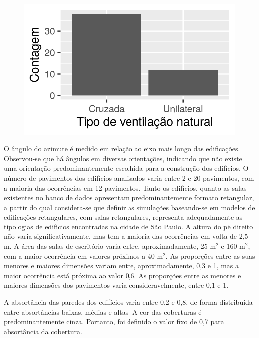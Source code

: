 \documentclass[brazil,hardcopy,openany]{ufscthesis} %
\begin{document}
\begin{figure}[H]
\begin{minipage}{.33\textwidth}
	\end{minipage}
	\begin{minipage}{.33\textwidth}
		\includegraphics[width=\linewidth]{img/hist_tipo_vn.png}
	\end{minipage}
\end{figure}
\newpage

O ângulo do azimute é medido em relação ao eixo mais longo das edificações. Observou-se que há ângulos em diversas orientações, indicando que não existe uma orientação predominantemente escolhida para a construção dos edifícios.
O número de pavimentos dos edifícios analisados varia entre 2 e 20 pavimentos, com a maioria das ocorrências em 12 pavimentos.
Tanto os edifícios, quanto as salas existentes no banco de dados apresentam predominantemente formato retangular, a partir do qual considera-se que definir as simulações baseando-se em modelos de edificações retangulares, com salas retangulares, representa adequadamente as tipologias de edifícios encontradas na cidade de São Paulo.
A altura do pé direito não varia significativamente, mas tem a maioria das ocorrências em volta de 2,5 m.
A área das salas de escritório varia entre, aproximadamente, 25 m$^2$ e 160 m$^2$, com a maior ocorrência em valores próximos a 40 m$^2$.
As proporções entre as suas menores e maiores dimensões variam entre, aproximadamente, 0,3 e 1, mas a maior ocorrência está próxima ao valor 0,6.
As proporções entre as menores e maiores dimensões dos pavimentos varia consideravelmente, entre 0,1 e 1.

A absortância das paredes dos edifícios varia entre 0,2 e 0,8, de forma distribuída entre absortâncias baixas, médias e altas. A cor das coberturas é predominantemente cinza. Portanto, foi definido o valor fixo de 0,7 para absortância da cobertura.
\end{document}
